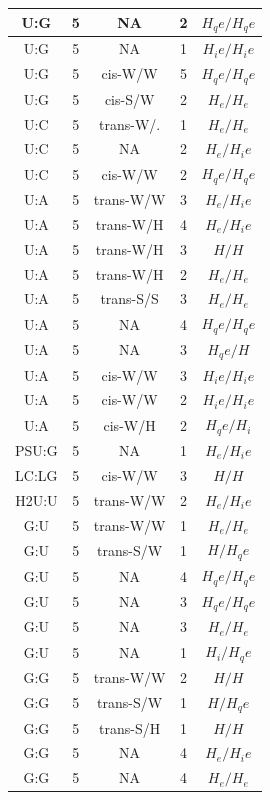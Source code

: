 \begin{center}
\begin{longtable}{c|c|c|c|c}
U:G & 5 & NA & 2 & $H_qe/H_qe$ \\  \hline
U:G & 5 & NA & 1 & $H_ie/H_ie$ \\  \hline
U:G & 5 & cis-W/W & 5 & $H_qe/H_qe$ \\  \hline
U:G & 5 & cis-S/W & 2 & $H_e/H_e$ \\  \hline
U:C & 5 & trans-W/. & 1 & $H_e/H_e$ \\  \hline
U:C & 5 & NA & 2 & $H_e/H_ie$ \\  \hline
U:C & 5 & cis-W/W & 2 & $H_qe/H_qe$ \\  \hline
U:A & 5 & trans-W/W & 3 & $H_e/H_ie$ \\  \hline
U:A & 5 & trans-W/H & 4 & $H_e/H_ie$ \\  \hline
U:A & 5 & trans-W/H & 3 & $H/H$ \\  \hline
U:A & 5 & trans-W/H & 2 & $H_e/H_e$ \\  \hline
U:A & 5 & trans-S/S & 3 & $H_e/H_e$ \\  \hline
U:A & 5 & NA & 4 & $H_qe/H_qe$ \\  \hline
U:A & 5 & NA & 3 & $H_qe/H$ \\  \hline
U:A & 5 & cis-W/W & 3 & $H_ie/H_ie$ \\  \hline
U:A & 5 & cis-W/W & 2 & $H_ie/H_ie$ \\  \hline
U:A & 5 & cis-W/H & 2 & $H_qe/H_i$ \\  \hline
PSU:G & 5 & NA & 1 & $H_e/H_ie$ \\  \hline
LC:LG & 5 & cis-W/W & 3 & $H/H$ \\  \hline
H2U:U & 5 & trans-W/W & 2 & $H_e/H_ie$ \\  \hline
G:U & 5 & trans-W/W & 1 & $H_e/H_e$ \\  \hline
G:U & 5 & trans-S/W & 1 & $H/H_qe$ \\  \hline
G:U & 5 & NA & 4 & $H_qe/H_qe$ \\  \hline
G:U & 5 & NA & 3 & $H_qe/H_qe$ \\  \hline
G:U & 5 & NA & 3 & $H_e/H_e$ \\  \hline
G:U & 5 & NA & 1 & $H_i/H_qe$ \\  \hline
G:G & 5 & trans-W/W & 2 & $H/H$ \\  \hline
G:G & 5 & trans-S/W & 1 & $H/H_qe$ \\  \hline
G:G & 5 & trans-S/H & 1 & $H/H$ \\  \hline
G:G & 5 & NA & 4 & $H_e/H_ie$ \\  \hline
G:G & 5 & NA & 4 & $H_e/H_e$ \\  \hline

\end{longtable}
\end{center}
